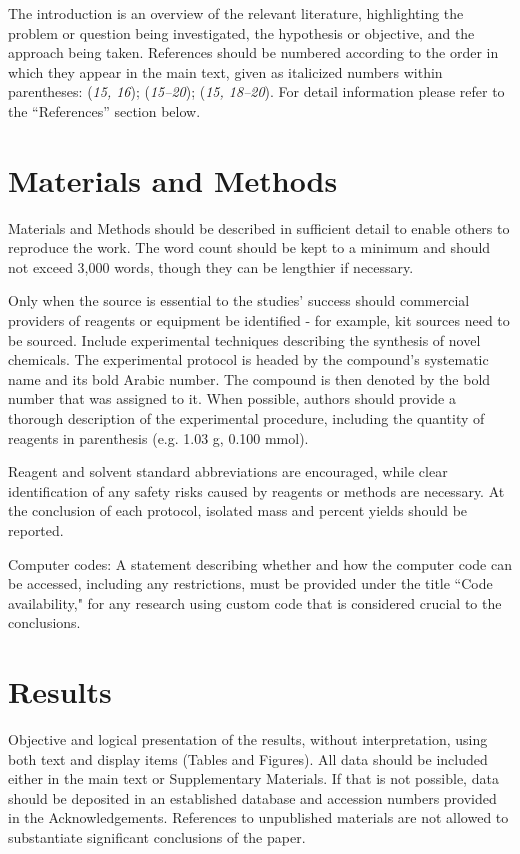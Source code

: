\documentclass[12pt]{Definitions/academia}
\begin{document}
The introduction is an overview of the relevant literature, highlighting the problem or question being investigated, the hypothesis or objective, and the approach being taken. References should be numbered according to the order in which they appear in the main text, given as italicized numbers within parentheses: (\textit{15, 16}); (\textit{15--20}); (\textit{15, 18--20}). For detail information please refer to the ``References'' section below.

\section{Materials and Methods}

 Materials and Methods should be described in sufficient detail to enable others to reproduce the work. The word count should be kept to a minimum and should not exceed 3,000 words, though they can be lengthier if necessary.

Only when the source is essential to the studies' success should commercial providers of reagents or equipment be identified  - for example, kit sources need to be sourced. Include experimental techniques describing the synthesis of novel chemicals. The experimental protocol is headed by the compound's systematic name and its bold Arabic number. The compound is then denoted by the bold number that was assigned to it. When possible, authors should provide a thorough description of the experimental procedure, including the quantity of reagents in parenthesis (e.g. 1.03 g, 0.100 mmol).

Reagent and solvent standard abbreviations are encouraged, while clear identification of any safety risks caused by reagents or methods are necessary. At the conclusion of each protocol, isolated mass and percent yields should be reported.

Computer codes: A statement describing whether and how the computer code can be accessed, including any restrictions, must be provided under the title ``Code availability," for any research using custom code that is considered crucial to the conclusions.




\section{Results}

Objective and logical presentation of the results, without interpretation, using both text and display items (Tables and Figures). All data should be included either in the main text or Supplementary Materials. If that is not possible, data should be deposited in an established database and accession numbers provided in the Acknowledgements. References to unpublished materials are not allowed to substantiate significant conclusions of the paper.
\end{document}

